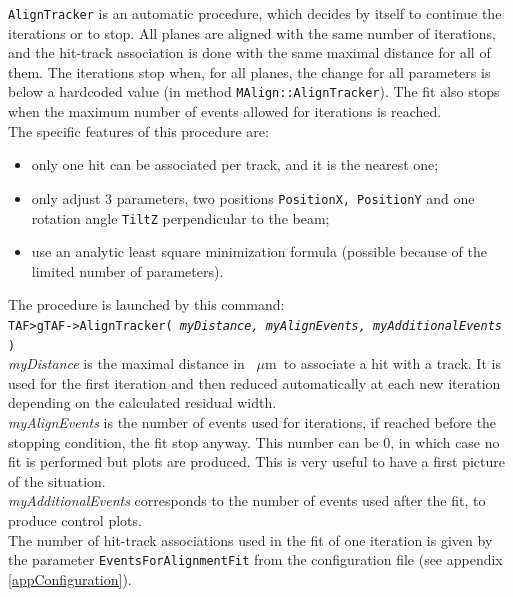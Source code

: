 \documentclass[a4paper, 12pt, twoside]{article}
\def\mm{~$\mu$m}
\begin{document}
\noindent
{\tt AlignTracker} is an automatic procedure, which decides by itself to continue the iterations or to stop. All planes are aligned with the same number of iterations, and the hit-track association is done with the same maximal distance for all of them. The iterations stop when, for all planes, the change for all parameters is below a hardcoded value (in method {\tt MAlign::AlignTracker}). The fit also stops when the maximum number of events allowed for iterations is reached.\\
The specific features of this procedure are:
\begin{itemize}
\item only one hit can be associated per track, and it is the nearest one;
\item only adjust 3 parameters, two positions {\tt PositionX, PositionY} and one rotation angle {\tt TiltZ} perpendicular to the beam;
\item use an analytic least square minimization formula (possible because of the limited number of parameters).
\end{itemize}


\noindent
The procedure is launched by this command:\\
{\tt TAF>gTAF->AlignTracker( {\it myDistance, myAlignEvents, myAdditionalEvents} )}\\

\noindent
{\it myDistance} is the maximal distance in \mm\ to associate a hit with a track. It is used for the first iteration and then reduced  automatically at each new iteration depending on the calculated residual width.\\
{\it myAlignEvents} is the number of events used for iterations, if reached before the stopping condition, the fit stop anyway. This number can be 0, in which case no fit is performed but plots are produced. This is very useful to have a first picture of the situation.\\
{\it myAdditionalEvents} corresponds to the number of events used after the fit, to produce control plots.\\
The number of hit-track associations used in the fit of one iteration is given by the parameter {\tt EventsForAlignmentFit} from the configuration file (see appendix \ref{appConfiguration}).
\end{document}
